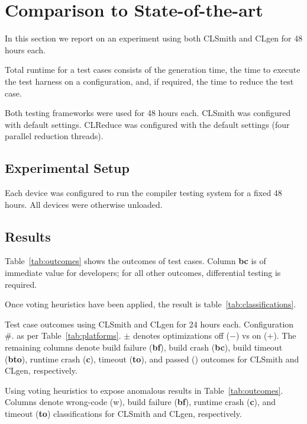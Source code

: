 \section{Comparison to State-of-the-art}\label{sec:vs_clsmith}

In this section we report on an experiment using both CLSmith and CLgen for 48 hours each.

Total runtime for a test cases consists of the generation time, the time to execute the test harness on a configuration, and, if required, the time to reduce the test case.

Both testing frameworks were used for 48 hours each. CLSmith was configured with default settings. CLReduce was configured with the default settings (four parallel reduction threads).

\subsection{Experimental Setup}

Each device was configured to run the compiler testing system for a fixed 48 hours. All devices were otherwise unloaded.

\subsection{Results}

Table~\ref{tab:outcomes} shows the outcomes of test cases. Column \textbf{bc} is of immediate value for developers; for all other outcomes, differential testing is required.

Once voting heuristics have been applied, the result is table~\ref{tab:classifications}.

\begin{table}
	\scriptsize %
	\centering %
	
	\caption{Test case outcomes using CLSmith and CLgen for 24 hours each. Configuration \#. as per Table~\ref{tab:platforms}. $\pm$ denotes optimizations off ($-$) vs on ($+$). The remaining columns denote build failure (\textbf{bf}), build crash (\textbf{bc}), build timeout (\textbf{bto}), runtime crash (\textbf{c}), timeout (\textbf{to}), and passed (\textbf{\cmark}) outcomes for CLSmith and CLgen, respectively. }
	\label{tab:outcomes}
\end{table}

\begin{table}
	\scriptsize %
	\centering %
	
	\caption{Using voting heuristics to expose anomalous results in Table~\ref{tab:outcomes}. Columns denote wrong-code (w), build failure (\textbf{bf}), runtime crash (\textbf{c}), and timeout (\textbf{to}) classifications for CLSmith and CLgen, respectively. }
	\label{tab:classifications}
\end{table}

